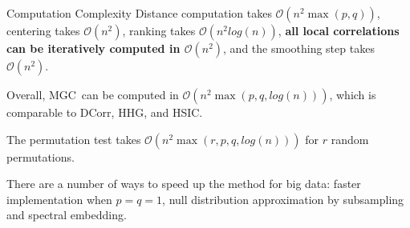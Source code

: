 \documentclass[mathserif,t]{beamer}
\newcommand{\Mgc}{MGC}
\begin{document}
\begin{frame}{Computation Complexity}
Distance computation takes $\mathcal{O}(n^2 \max(p,q))$, centering takes $\mathcal{O}(n^2)$, ranking takes $\mathcal{O}(n^2 log(n))$, \textbf{all local correlations can be iteratively computed in $\mathcal{O}(n^2)$}, and the smoothing step takes $\mathcal{O}(n^2)$.

\pause
\medskip
Overall, \Mgc~can be computed in $\mathcal{O}(n^2 \max(p,q,log(n)))$, which is comparable to DCorr, HHG, and HSIC. 

\pause
\medskip
The permutation test takes $\mathcal{O}(n^2 \max(r,p,q,log(n)))$ for $r$ random permutations.
\pause
\medskip

There are a number of ways to speed up the method for big data: faster implementation when $p=q=1$, null distribution approximation by subsampling and spectral embedding.
\end{frame}
\end{document}
